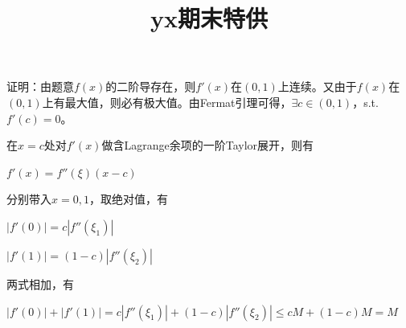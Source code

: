 \documentclass{ctexbook}
\title{yx期末特供}
\begin{document}
	证明：由题意$f(x)$的二阶导存在，则$f'(x)$在$(0,1)$上连续。又由于$f(x)$在$(0,1)$上有最大值，则必有极大值。由Fermat引理可得，$\exists c\in (0,1)$，s.t.$f'(c)=0$。
	
	在$x=c$处对$f'(x)$做含Lagrange余项的一阶Taylor展开，则有
	
	\centerline{$f'(x)=f''(\xi)(x-c)$}
	
	分别带入$x=0,1$，取绝对值，有
	
	\centerline{$|f'(0)|=c|f''(\xi _1)|$}
	
	\centerline{$|f'(1)|=(1-c)|f''(\xi _2)|$}
	
	两式相加，有
	
	\centerline{$|f'(0)|+|f'(1)|=c|f''(\xi _1)|+(1-c)|f''(\xi _2)| \le cM+(1-c)M=M$}
	
	
	
\end{document}
